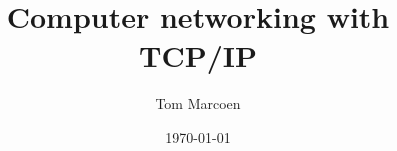 \title{Computer networking with TCP/IP}
\author{Tom Marcoen}
\date{\today}



\usepackage{multirow}
\usepackage{tikz}
\usepackage{siunitx}
\usetikzlibrary[positioning]



\maketitle
{}










\begin{frame}
    
\end{frame}

